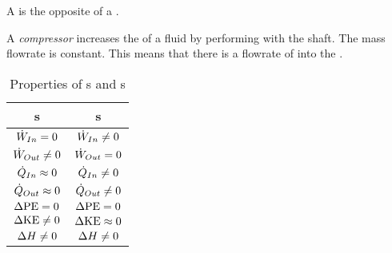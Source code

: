 A  is the opposite of a .

\begin{definition}[Compressor]\label{def:Compressor}
  A \emph{compressor} increases the  of a fluid by performing  with the shaft.
  The mass flowrate is constant.
  This means that there is a flowrate of  into the .
\end{definition}

\begin{table}[h!tbp]
  \centering
  \begin{tabular}{cc}
    \toprule
    \nameref{def:Turbine}s & \nameref{def:Compressor}s \\
    \midrule
    $\dot{W}_{In} = 0$ & $\dot{W}_{In} \neq 0$ \\
    $\dot{W}_{Out} \neq 0$ & $\dot{W}_{Out} = 0$ \\
    $\dot{Q}_{In} \approx 0$ & $\dot{Q}_{In} \neq 0$ \\
    $\dot{Q}_{Out} \approx 0$ & $\dot{Q}_{Out} \neq 0$ \\
    $\Delta \mathrm{PE} = 0$ & $\Delta \mathrm{PE} = 0$ \\
    $\Delta \mathrm{KE} \neq 0$ & $\Delta \mathrm{KE} \approx 0$ \\
    $\Delta H \neq 0$ & $\Delta H \neq 0$ \\
    \bottomrule
  \end{tabular}
  \caption{Properties of s and s}
  \label{tab:Turbine_Compressor_Properties}
\end{table}

